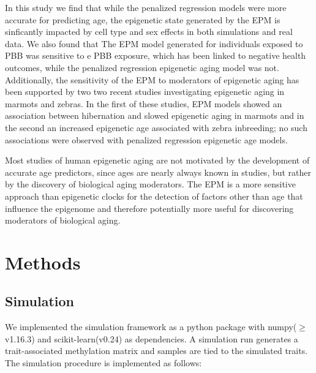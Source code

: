 \documentclass{article}
\begin{document}
{\begin{linenumbers}
In this study we find that while the penalized regression models were more accurate for predicting age, the epigenetic 
state generated by the EPM is sinficantly impacted by  cell type and sex effects in both simulations and real data. 
We also found that The EPM model generated for individuals exposed to PBB was sensitive to e PBB exposure, which has 
been linked to negative health outcomes, while the penalized regression epigenetic aging model was not. Additionally, 
the sensitivity of the EPM to moderators of epigenetic aging has been supported by two two recent studies  
investigating epigenetic aging in marmots\cite{Pinho2021-gm} and zebras\cite{Larison2021-ts}. In the first of 
these studies, EPM models showed an association between hibernation and slowed epigenetic aging in marmots and 
in the second an increased epigenetic age associated with zebra inbreeding; no such associations were observed with 
penalized regression epigenetic age models. 

Most studies of human epigenetic aging are not motivated by the development of accurate age predictors, since ages 
are nearly always known in studies,  but rather by the discovery of  biological aging moderators. The EPM is a more 
sensitive approach than epigenetic clocks for the detection of factors other than age that influence the epigenome  
and therefore potentially more useful for discovering moderators of biological aging. 

\section{Methods}

\subsection{Simulation}

We implemented the simulation framework as a python package with numpy($\geq$v1.16.3)\cite{Harris2020-yb} and 
scikit-learn(v0.24)\cite{Pedregosa2011-fi} as dependencies. A simulation run generates  a trait-associated methylation
matrix and samples are tied to the simulated  traits. The simulation procedure is implemented as follows:
\begin{itemize}


\end{itemize}
\end{linenumbers}}
\end{document}
